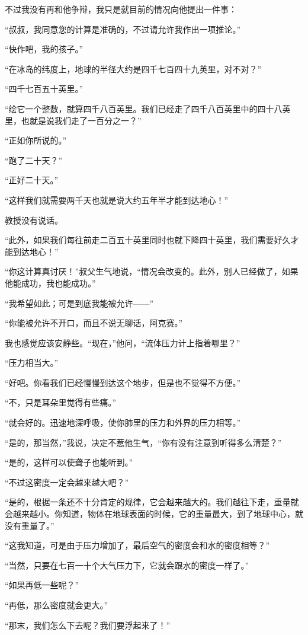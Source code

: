 \documentclass[10pt]{book}
\begin{document}
不过我没有再和他争辩，我只是就目前的情况向他提出一件事：

“叔叔，我同意您的计算是准确的，不过请允许我作出一项推论。”

“快作吧，我的孩子。”

“在冰岛的纬度上，地球的半径大约是四千七百四十九英里，对不对？”

“四千七百五十英里。”

“绘它一个整数，就算四千八百英里。我们已经走了四千八百英里中的四十八英里，也就是说我们走了一百分之一？”

“正如你所说的。”

“跑了二十天？”

“正好二十天。”

“这样我们就需要两千天也就是说大约五年半才能到达地心！”

教授没有说话。

“此外，如果我们每往前走二百五十英里同时也就下降四十英里，我们需要好久才能到达地心！”

“你这计算真讨厌！”叔父生气地说，“情况会改变的。此外，别人已经做了，如果他能成功，我也能成功。”

“我希望如此；可是到底我能被允许——”

“你能被允许不开口，而且不说无聊话，阿克赛。”

我也感觉应该安静些。“现在，”他问，“流体压力计上指着哪里？”

“压力相当大。”

“好吧。你看我们已经慢慢到达这个地步，但是也不觉得不方便。”

“不，只是耳朵里觉得有些痛。”

“就会好的。迅速地深呼吸，使你肺里的压力和外界的压力相等。”

“是的，那当然，”我说，决定不惹他生气，“你有没有注意到听得多么清楚？”

“是的，这样可以使聋子也能听到。”

“不过这密度一定会越来越大吧？”

“是的，根据一条还不十分肯定的规律，它会越来越大的。我们越往下走，重量就会越来越小。你知道，物体在地球表面的时候，它的重量最大，到了地球中心，就没有重量了。”

“这我知道，可是由于压力增加了，最后空气的密度会和水的密度相等？”

“当然，只要在七百一十个大气压力下，它就会跟水的密度一样了。”

“如果再低一些呢？”

“再低，那么密度就会更大。”

“那末，我们怎么下去呢？我们要浮起来了！”
\end{document}
